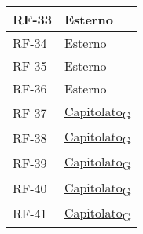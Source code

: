 \begin{longtable}{|>{\centering\arraybackslash}m{}|>{\centering\arraybackslash}m{}|}
	RF-33              & Esterno                                                                                                                                                                                                                                              \\\hline
	RF-34              & Esterno                                                                                                                                                                                                                                              \\\hline
	RF-35              & Esterno                                                                                                                                                                                                                                              \\\hline
	RF-36              & Esterno                                                                                                                                                                                                                                              \\\hline
	RF-37              & \href{https://7last.github.io/docs/rtb/documentazione-interna/glossario\#capitolato}{Capitolato\textsubscript{G}}                                                                                                                                    \\\hline
	RF-38              & \href{https://7last.github.io/docs/rtb/documentazione-interna/glossario\#capitolato}{Capitolato\textsubscript{G}}                                                                                                                                    \\\hline
	RF-39              & \href{https://7last.github.io/docs/rtb/documentazione-interna/glossario\#capitolato}{Capitolato\textsubscript{G}}                                                                                                                                    \\\hline
	RF-40              & \href{https://7last.github.io/docs/rtb/documentazione-interna/glossario\#capitolato}{Capitolato\textsubscript{G}}                                                                                                                                    \\\hline
	RF-41              & \href{https://7last.github.io/docs/rtb/documentazione-interna/glossario\#capitolato}{Capitolato\textsubscript{G}}                                                                                                                                    \\\hline

\end{longtable}
